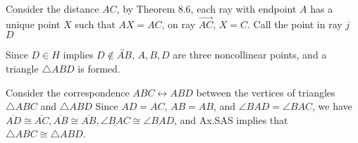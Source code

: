 \documentclass{report}
\begin{document}
    \bigbreak \noindent 
    \begin{figure}[ht]
        \centering
        \label{fig:f2}
    \end{figure}
    \bigbreak \noindent 
    Consider the distance $AC$, by Theorem 8.6, each ray with endpoint $A$ has a unique point $X$ such that $AX = AC$, on ray $\overrightarrow{AC}$, $X = C$. Call the point in ray $j$ $D$
    \pagebreak \bigbreak \noindent 
    \begin{figure}[ht]
        \centering
        \label{fig:f3}
    \end{figure}
    \bigbreak \noindent 
    Since $D \in H$ implies $D \not\in \overleftrightarrow{AB}$, $A,B,D$ are three noncollinear points, and a triangle $ \triangle ABD$ is formed.
    \bigbreak \noindent 
    \begin{figure}[ht]
        \centering
        \label{fig:f4}
    \end{figure}
    \bigbreak \noindent 
    Consider the correspondence $ABC \leftrightarrow ABD$ between the vertices of triangles $\triangle ABC$ and $\triangle ABD$
    \bigbreak \noindent 
    Since $AD = AC$, $AB = AB$, and $\angle BAD =  \angle BAC$, we have $\overline{AD} \cong \overline{AC}, \overline{AB} \cong \overline{AB}, \underline{\angle BAC} \cong \underline{\angle BAD}$, and Ax.SAS implies that $ \triangle ABC \cong \triangle ABD $. \endpf
\end{document}
